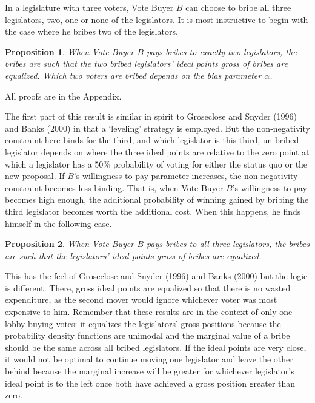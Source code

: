 \documentclass[12pt]{article}
\newtheorem{proposition}{Proposition}
\newcommand{\al}{\alpha}
\begin{document}
In a legislature with three voters, Vote Buyer $B$ can choose to bribe all three legislators, two, one or none of the legislators. It is most instructive to begin with the case where he bribes two of the legislators.

\begin{proposition}
  When Vote Buyer $B$ pays bribes to exactly two legislators, the bribes are such that the two bribed legislators' ideal points gross of bribes are equalized. Which two voters are bribed depends on the bias parameter $\al$.
	\label{prop:2NNB}
\end{proposition}

All proofs are in the Appendix.

The first part of this result is similar in spirit to Groseclose and Snyder (1996) and Banks (2000) in that a `leveling' strategy is employed. But the non-negativity constraint here binds for the third, and which legislator is this third, un-bribed legislator depends on where the three ideal points are relative to the zero point at which a legislator has a 50$\%$ probability of voting for either the status quo or the new proposal. If $B$'s willingness to pay parameter increases, the non-negativity constraint becomes less binding. That is, when Vote Buyer $B$'s willingness to pay becomes high enough, the additional probability of winning gained by bribing the third legislator becomes worth the additional cost. When this happens, he finds himself in the following case.

\begin{proposition}
  When Vote Buyer $B$ pays bribes to all three legislators, the bribes are such that the legislators' ideal points gross of bribes are equalized.
	\label{prop:3NNB}
\end{proposition}

This has the feel of Groseclose and Snyder (1996) and Banks (2000) but the logic is different. There, gross ideal points are equalized so that there is no wasted expenditure, as the second mover would ignore whichever voter was most expensive to him. Remember that these results are in the context of only one lobby buying votes: it equalizes the legislators' gross positions because the probability density functions are unimodal and the marginal value of a bribe should be the same across all bribed legislators. If the ideal points are very close, it would not be optimal to continue moving one legislator and leave the other behind because the marginal increase will be greater for whichever legislator's ideal point is to the left once both have achieved a gross position greater than zero.
\end{document}

